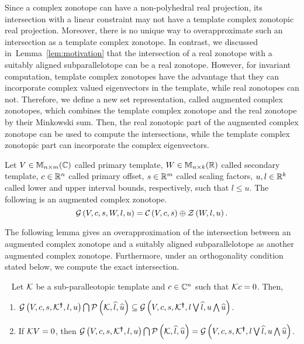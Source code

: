 Since a complex zonotope can have a non-polyhedral real projection,
its intersection with a linear constraint may not have a template
complex zonotopic real projection.  Moreover, there is no unique way
to overapproximate such an intersection as a template complex
zonotope.  In contrast, we discussed in~Lemma~\ref{lem:motivation}
that the intersection of a real zonotope with a suitably aligned
subparallelotope can be a real zonotope.  However, for invariant
computation, template complex zonotopes have the advantage that they
can incorporate complex valued eigenvectors in the template, while
real zonotopes can not.  Therefore, we define a new set
representation, called augmented complex zonotopes, which combines the
template complex zonotope and the real zonotope by their Minkowski
sum.  Then, the real zonotopic part of the augmented complex zonotope
can be used to compute the intersections, while the template complex
zonotopic part can incorporate the complex eigenvectors.
%
\begin{definition}
Let $V\in\mathbb{M}_{n\times m}(\mathbb{C})$ called primary template, $W\in\mathbb{M}_{n\times k}(\mathbb{R})$
called secondary template, $c\in\mathbb{R}^n$ called primary offset,
$s\in\mathbb{R}^m$ called scaling factors, $u,l\in\mathbb{R}^k$ called lower
and upper interval bounds, respectively, such that $l\leq u$.  The
following is an augmented complex
zonotope.
\begin{equation*}
\mathcal{G}\left(V,c,s,W,l,u\right) = \mathcal{C}\left(V,c,s\right)\oplus\mathcal{Z}\left(W,l,u\right).
\end{equation*}
\end{definition}
%
The following lemma gives an overapproximation of the intersection
between an augmented complex zonotope and a suitably aligned
subparallelotope as another augmented complex zonotope.  Furthermore,
under an orthogonality condition stated below, we compute the exact
intersection.
%
\begin{lemma}~\label{lem:acz-int}
Let $\mathcal{K}$ be a sub-paralleotopic template and $c\in\mathbb{C}^n$
such that $\mathcal{K} c=0$.  Then,
\begin{enumerate}
\item
  $\mathcal{G}\left(V,c,s,\mathcal{K}^{\bm{\dagger}},l,u\right)\bigcap\mathcal{P}\left(\mathcal{K},\widehat{l},\widehat{u}\right)\subseteq
  \mathcal{G}\left(V,c,s,\mathcal{K}^{\bm{\dagger}},l\bigvee\widehat{l},u\bigwedge\widehat{u}\right)$.
\item If $\mathcal{K} V=0$, then $\mathcal{G}\left(V,c,s,\mathcal{K}^{\bm{\dagger}},l,u\right)\bigcap\mathcal{P}\left(\mathcal{K},\widehat{l},\widehat{u}\right)=
  \mathcal{G}\left(V,c,s,\mathcal{K}^{\bm{\dagger}},l\bigvee\widehat{l},u\bigwedge\widehat{u}\right)$.
\end{enumerate}
\end{lemma}
